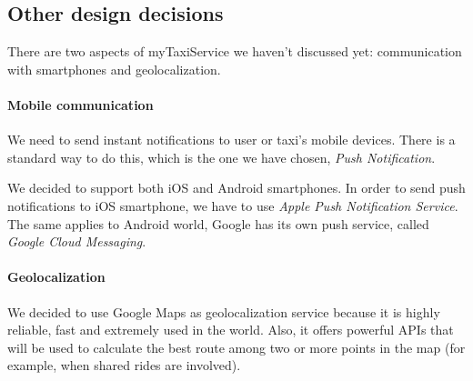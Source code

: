     



\pagebreak
\subsection{Other design decisions}

There are two aspects of myTaxiService we haven't discussed yet: communication 
with smartphones and geolocalization.

\paragraph {Mobile communication}
We need to send instant notifications to 
user or taxi's mobile devices. There is a standard way to do this, 
which is the one we have chosen, \textit{Push Notification}.

We decided to support both iOS and Android smartphones. In order to send push
notifications to iOS smartphone, we have to use \textit{Apple Push Notification Service}.
The same applies to Android world, Google has its own push service, called 
\textit{Google Cloud Messaging}.

\paragraph {Geolocalization}
We decided to use Google Maps as geolocalization service because it is highly
reliable, fast and extremely used in the world.
Also, it offers powerful APIs that will be used to calculate the best route
among two or more points in the map (for example, when shared rides are involved).